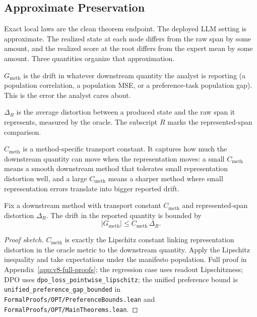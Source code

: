 \subsection{Approximate Preservation}

Exact local laws are the clean theorem endpoint. The deployed LLM
setting is approximate. The realized state at each node differs from
the raw span by some amount, and the realized score at the root
differs from the expert mean by some amount. Three quantities organize
that approximation.

\(G_{\mathrm{meth}}\) is the drift in whatever downstream quantity the
analyst is reporting (a population correlation, a population MSE, or a
preference-task population gap). This is the error the analyst cares
about.

\(\Delta_R\) is the average distortion between a produced state and
the raw span it represents, measured by the oracle. The subscript
\(R\) marks the represented-span comparison.

\(C_{\mathrm{meth}}\) is a method-specific transport constant. It
captures how much the downstream quantity can move when the
representation moves: a small \(C_{\mathrm{meth}}\) means a smooth
downstream method that tolerates small representation distortion well,
and a large \(C_{\mathrm{meth}}\) means a sharper method where small
representation errors translate into bigger reported drift.

\begin{proposition}\label{prop:v10-population-gap}
Fix a downstream method with transport constant \(C_{\mathrm{meth}}\)
and represented-span distortion \(\Delta_R\). The drift in the
reported quantity is bounded by
\begin{equation}
\label{eq:v8-population-gap}
  |G_{\mathrm{meth}}|
  \le
  C_{\mathrm{meth}}\,\Delta_R .
\end{equation}
\end{proposition}

\begin{proof}[Proof sketch]
\(C_{\mathrm{meth}}\) is exactly the Lipschitz constant linking
representation distortion in the oracle metric to the downstream
quantity. Apply the Lipschitz inequality and take expectations under
the manifesto population. Full proof in
Appendix~\ref{app:v8-full-proofs}; the regression case uses readout
Lipschitzness; DPO uses
\texttt{dpo\_loss\_pointwise\_lipschitz}; the unified preference
bound is \texttt{unified\_preference\_gap\_bounded} in
\texttt{FormalProofs/OPT/PreferenceBounds.lean} and
\texttt{FormalProofs/OPT/MainTheorems.lean}.
\end{proof}

